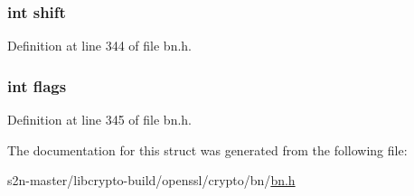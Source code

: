 \subsubsection[{\texorpdfstring{shift}{shift}}]{\setlength{\rightskip}{0pt plus 5cm}int shift}\hypertarget{structbn__recp__ctx__st_afd8d704fff636cf0234e92c1eade927c}{}\label{structbn__recp__ctx__st_afd8d704fff636cf0234e92c1eade927c}


Definition at line 344 of file bn.\+h.

\subsubsection[{\texorpdfstring{flags}{flags}}]{\setlength{\rightskip}{0pt plus 5cm}int flags}\hypertarget{structbn__recp__ctx__st_ac8bf36fe0577cba66bccda3a6f7e80a4}{}\label{structbn__recp__ctx__st_ac8bf36fe0577cba66bccda3a6f7e80a4}


Definition at line 345 of file bn.\+h.



The documentation for this struct was generated from the following file\+:\begin{DoxyCompactItemize}
\item 
s2n-\/master/libcrypto-\/build/openssl/crypto/bn/\hyperlink{crypto_2bn_2bn_8h}{bn.\+h}\end{DoxyCompactItemize}
